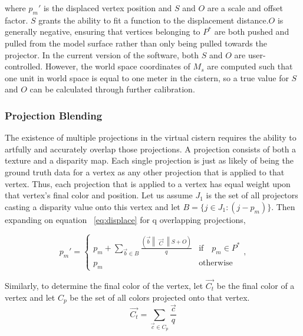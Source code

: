 \documentclass[twocolumn]{article}
\begin{document}
where $p_{m}'$ is the displaced vertex position and $S$ and $O$ are a scale and offset factor. $S$ grants the ability to fit a function to the displacement distance.$O$ is generally negative, ensuring that vertices belonging to $P^{*}$ are both pushed and pulled from the model surface rather than only being pulled towards the projector. In the current version of the software, both $S$ and $O$ are user-controlled. However, the world space coordinates of $M_s$ are computed such that one unit in world space is equal to one meter in the cistern, so a true value for $S$ and $O$ can be calculated through further calibration.
 
 \subsubsection{Projection Blending}

The existence of multiple projections in the virtual cistern requires the ability to artfully and accurately overlap those projections.
A projection consists of both a texture and a disparity map.
Each single projection is just as likely of being the ground truth data for a vertex as any other projection that is applied to that vertex. 
Thus, each projection that is applied to a vertex has equal weight upon that vertex's final color and position.
Let us assume $J_1$ is the set of all projectors casting a disparity value onto this vertex and let $B = \{j \in J_1 : (j - p_m)\}$. 
Then expanding on equation ~\ref{eq:displace} for q overlapping projections,

\begin{equation}
p_{m}' = \left \{ 
\begin{array}{ll}
p_{m} + \sum\limits_{\vec{b} \in B} \frac{(\vec{b} \begin{Vmatrix}\vec{C}\end{Vmatrix} S + O)}{q} & \text{if} \quad p_{m} \in P^{*}\\
p_{m} & \text{otherwise}
\end{array},\right.
\label{eq:displaceBlend}
\end{equation}

Similarly, to determine the final color of the vertex, let $\vec{C_t}$ be the final color of a vertex and let $C_p$ be the set of all colors projected onto that vertex. 
\begin{equation}
\vec{C_t} = \sum\limits_{\vec{c} \in C_p} \frac{\vec{c}}{q} 
\label{eq:colorBlend}
\end{equation}
\end{document}
